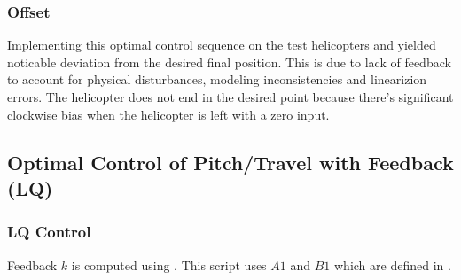 \subsubsection{Offset}
Implementing this optimal control sequence on the test helicopters and yielded noticable deviation from the desired final position. This is due to lack of feedback to account for physical disturbances, modeling inconsistencies and linearizion errors.
The helicopter does not end in the desired point because there's significant clockwise bias when the helicopter is left with a zero input.

\subsection{Optimal Control of Pitch/Travel with Feedback (LQ)}

\subsubsection{LQ Control}
Feedback $k$ is computed using .  This script uses $A1$ and $B1$ which are defined in .

